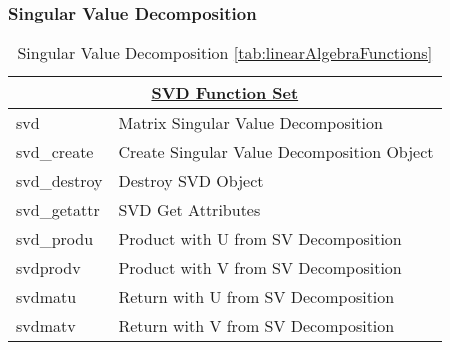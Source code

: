 \subsubsection*{Singular Value Decomposition} 
\begin{table}[H]
\caption{Singular Value Decomposition \ref{tab:linearAlgebraFunctions}}
\label{tab:singularValueDecompostion}
\begin{center}
\begin{tabular}{|l|l|}
\multicolumn{2}{c}{\hyperlink{svdFunc}{\rmfamily \bfseries SVD Function Set}}\\
\hline
svd & Matrix Singular Value Decomposition\\
svd\_create & Create Singular Value Decomposition Object \\
svd\_destroy & Destroy SVD Object \\
svd\_getattr & SVD Get Attributes\\
svd\_produ & Product with U from SV Decomposition \\
svdprodv & Product with V from SV Decomposition \\
svdmatu & Return with U from SV Decomposition\\
svdmatv & Return with V from SV Decomposition\\
\hline\end{tabular}
\end{center}
\label{default}
\end{table}%